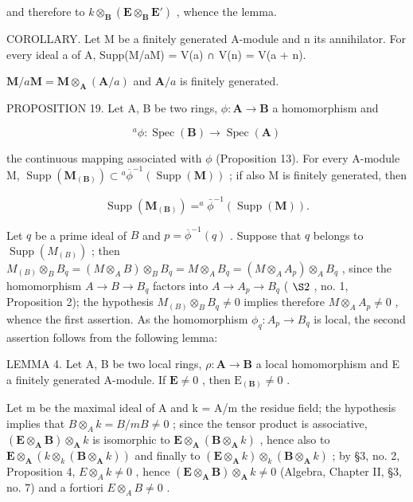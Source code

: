 and therefore to \(k \otimes_{\mathbf{B}} (\mathbf{E} \otimes_{\mathbf{B}} \mathbf{E}')\) , whence the lemma.

COROLLARY. Let M be a finitely generated A-module and n its annihilator. For every ideal a of A, Supp(M/aM) = V(a) ∩ V(n) = V(a + n).

\(\mathbf{M} / a\mathbf{M} = \mathbf{M}\otimes_{\mathbf{A}}(\mathbf{A} / a)\) and \(\mathbf{A} / a\) is finitely generated.

PROPOSITION 19. Let A, B be two rings, \(\phi: \mathbf{A} \to \mathbf{B}\) a homomorphism and

\[
^ {a} \phi : \operatorname{Spec} (\mathbf {B}) \rightarrow \operatorname{Spec} (\mathbf {A})
\]

the continuous mapping associated with \(\phi\) (Proposition 13). For every A-module M, \(\operatorname{Supp}(\mathbf{M}_{(\mathbf{B})}) \subset {}^a\overline{\phi}^{-1}(\operatorname{Supp}(\mathbf{M}))\) ; if also M is finitely generated, then

\[
\operatorname{Supp} (\mathbf {M} _ {(\mathbf {B})}) = ^ {a} \bar {\phi} ^ {- 1} (\operatorname{Supp} (\mathbf {M})).
\]

Let \(q\) be a prime ideal of \(B\) and \(p = \overline{\phi}^{-1}(q)\) . Suppose that \(q\) belongs to \(\operatorname{Supp}(M_{(B)})\) ; then \(M_{(B)} \otimes_B B_q = (M \otimes_A B) \otimes_B B_q = M \otimes_A B_q = (M \otimes_A A_p) \otimes_A B_q\) , since the homomorphism \(A \to B \to B_q\) factors into \(A \to A_p \to B_q\) ( \(\S 2\) , no. 1, Proposition 2); the hypothesis \(M_{(B)} \otimes_B B_q \neq 0\) implies therefore \(M \otimes_A A_p \neq 0\) , whence the first assertion. As the homomorphism \(\phi_q: A_p \to B_q\) is local, the second assertion follows from the following lemma:

LEMMA 4. Let A, B be two local rings, \(\rho: \mathbf{A} \to \mathbf{B}\) a local homomorphism and E a finitely generated A-module. If \(\mathbf{E} \neq 0\) , then \(\mathrm{E}_{(\mathbf{B})} \neq 0\) .

Let m be the maximal ideal of A and k = A/m the residue field; the hypothesis implies that \(B \otimes_{A} k = B/mB \neq 0\) ; since the tensor product is associative, \((\mathbf{E} \otimes_{\mathbf{A}} \mathbf{B}) \otimes_{\mathbf{A}} k\) is isomorphic to \(\mathbf{E} \otimes_{\mathbf{A}} (\mathbf{B} \otimes_{\mathbf{A}} k)\) , hence also to \(\mathbf{E} \otimes_{\mathbf{A}} (k \otimes_{k} (\mathbf{B} \otimes_{\mathbf{A}} k))\) and finally to \((\mathbf{E} \otimes_{\mathbf{A}} k) \otimes_{k} (\mathbf{B} \otimes_{\mathbf{A}} k)\) ; by §3, no. 2, Proposition 4, \(E \otimes_{A} k \neq 0\) , hence \((\mathbf{E} \otimes_{\mathbf{A}} \mathbf{B}) \otimes_{\mathbf{A}} k \neq 0\) (Algebra, Chapter II, §3, no. 7) and a fortiori \(E \otimes_{A} B \neq 0\) .

